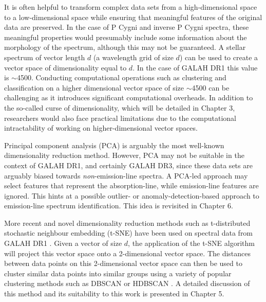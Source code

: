 It is often helpful to transform complex data sets from a high-dimensional space to a low-dimensional space while ensuring that meaningful features of the original data are preserved. In the case of P Cygni and inverse P Cygni spectra, these meaningful properties would presumably include some information about the morphology of the spectrum, although this may not be guaranteed. A stellar spectrum of vector length $d$ (a wavelength grid of size $d$) can be used to create a vector space of dimensionality equal to $d$. In the case of GALAH DR1 this value is $\sim$4500. Conducting computational operations such as clustering and classification on a higher dimensional vector space of size $\sim$4500 can be challenging as it introduces significant computational overheads. In addition to the so-called curse of dimensionality, which will be detailed in Chapter 3, researchers would also face practical limitations due to the computational intractability of working on higher-dimensional vector spaces.

Principal component analysis (PCA) is arguably the most well-known dimensionality reduction method. However, PCA may not be suitable in the context of GALAH DR1, and certainly GALAH DR3, since these data sets are arguably biased towards {\em non}-emission-line spectra. A PCA-led approach may select features that represent the absorption-line, while emission-line features are ignored. This hints at a possible outlier- or anomaly-detection-based approach to emission-line spectrum identification. This idea is revisited in Chapter 6.

More recent and novel dimensionality reduction methods such as t-distributed stochastic neighbour embedding (t-SNE) \citep{van2008visualizing} have been used on spectral data from GALAH DR1 \citep{traven2017galah}. Given a vector of size $d$, the application of the t-SNE algorithm will project this vector space onto a 2-dimensional vector space. The distances between data points on this 2-dimensional vector space can then be used to cluster similar data points into similar groups using a variety of popular clustering methods such as DBSCAN \citep{ester1996density} or HDBSCAN \citep{campello2013density}. A detailed discussion of this method and its suitability to this work is presented in Chapter 5.

